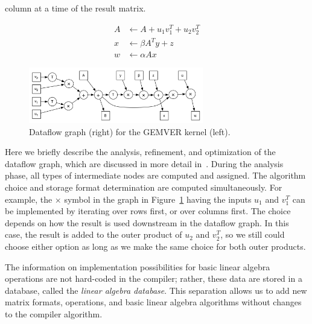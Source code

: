 \documentclass[runningheads]{llncs}
\begin{document}
column at a time of the result matrix.
\begin{figure}[ht]
\begin{minipage}{.3\textwidth}
\begin{align*}
  A &\gets A + u_1 v_1^T + u_2 v_2^T \\[-0.5ex]
  x &\gets \beta A^T y + z \\[-0.5ex]
  w &\gets \alpha A x
\end{align*} 
\end{minipage}
\begin{minipage}{.6\textwidth}
\includegraphics[width=3in]{figures/gemver-dataflow.png}
\end{minipage}
\caption{Dataflow graph (right) for the GEMVER kernel (left).}
\label{fig:gemver-dataflow}
\vspace{-.2in}
\end{figure}

Here we briefly describe the analysis, refinement, and optimization of the
dataflow graph, which are discussed in more detail in~\cite{Siek}. During the
analysis phase, all types of intermediate nodes are computed and
assigned. The algorithm choice and storage format determination are computed
simultaneously. For example, the $\times$ symbol in the graph in
Figure~\ref{fig:gemver-dataflow} having the inputs $u_1$ and $v_1^T$ can be
implemented by iterating over rows first, or over columns first. The choice
depends on how the result is used downstream in the dataflow graph.  In this
case, the result is added to the outer product of $u_2$ and $v_2^T$, so we
still could choose either option as long as we make the same choice for both
outer products. 

The information on implementation possibilities for basic linear algebra
operations are not hard-coded in the compiler; rather, these data are stored
in a database, called the \emph{linear algebra database}.  This separation
allows us to add new matrix formats, operations, and basic linear algebra
algorithms without changes to the compiler algorithm.
\end{document}
